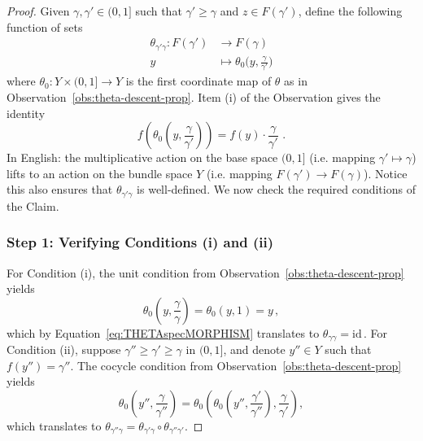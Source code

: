 \documentclass[a4paper, 11pt,reqno]{amsart}
\newcommand{\id}{\mathrm{id}}
\begin{document}
\begin{proof} Given $\gamma,\gamma'\in (0,1]$ such that $\gamma'\geq \gamma$ and $z\in F(\gamma')$, define the following function of sets
	\begin{align}\label{eq:THETAspecMORPHISM}
	\theta_{\gamma'\gamma}\colon  F(\gamma')&\longrightarrow F(\gamma)\\
	y&\longmapsto \theta_0\bigg(y,\frac{\gamma}{\gamma'}\bigg)\nonumber 
	\end{align}
	where $\theta_0\colon Y\times(0,1]\rightarrow Y$ is the first coordinate map of $\theta$ as in Observation~\ref{obs:theta-descent-prop}. Item (i) of the Observation gives the identity
		\begin{equation}
	f(\theta_0(y,\frac{\gamma}{\gamma'}))=f(y)\cdot\frac{\gamma}{\gamma'}\,\,.
	\end{equation}
In English: the multiplicative action on the base space $(0,1]$ (i.e. mapping $\gamma'\mapsto \gamma$) lifts to an action on the bundle space $Y$ (i.e. mapping $F(\gamma')\rightarrow F(\gamma)$). Notice this also ensures that $\theta_{\gamma'\gamma}$  is well-defined. %
We now check the required conditions of the Claim.	
	
	\subsubsection*{Step 1: Verifying Conditions (i) and (ii)} For Condition (i), the unit condition from Observation~\ref{obs:theta-descent-prop} yields
	$$\theta_0(y,\frac{\gamma}{\gamma})=\theta_0(y,1)=y\,,$$
	which by Equation~\eqref{eq:THETAspecMORPHISM} translates to $\theta_{\gamma\gamma}=\id\,.$
	For Condition (ii), suppose  $\gamma''\geq \gamma'\geq \gamma $ in $(0,1]$, and denote $y''\in Y$ such that $f(y'')=\gamma''$. The cocycle condition from Observation~\ref{obs:theta-descent-prop} yields $$\theta_0(y'',\frac{\gamma}{\gamma''})=\theta_0(\theta_0(y'',\frac{\gamma'}{\gamma''}),\frac{\gamma}{\gamma'}),$$ which translates to $\theta_{\gamma''\gamma}=\theta_{\gamma'\gamma}\circ\theta_{\gamma''\gamma'}$.
	
	

\end{proof}
\end{document}
